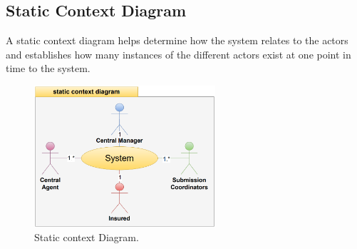 \subsection{Static Context Diagram}
A static context diagram helps determine how the system relates to the actors and establishes how many instances of the different actors exist at one point in time to the system.
\begin{figure}[h]
    \centering
    \includegraphics[width=0.6\textwidth]{figures/statdia.png}
    \caption{Static context Diagram.}
\end{figure} \ 
